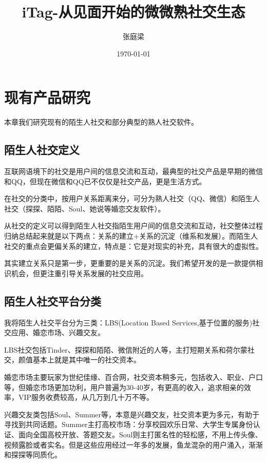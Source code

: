 \documentclass[UTF8]{ctexart}
\title{iTag-从见面开始的微微熟社交生态}
\author{张庭梁}
\date{\today}
\begin{document}
\maketitle

\section{现有产品研究}
本章我们研究现有的陌生人社交和部分典型的熟人社交软件。

\subsection{陌生人社交定义}

\begin{tcolorbox}
    互联网语境下的社交是用户间的信息交流和互动，最典型的社交产品是早期的微信和QQ，但现在微信和QQ已不仅仅是社交产品，更是生活方式。

    在社交的分类中，按用户关系距离来分，可分为熟人社交（QQ、微信）和陌生人社交（探探、陌陌、Soul、她说等婚恋交友软件）。

    从社交的定义可以得到陌生人社交指陌生用户间的信息交流和互动，社交整体过程归纳总结起来就是以下两点：关系的建立+关系的沉淀（维系和发展）。而陌生人社交的重点会更偏关系的建立，特点是：它是对现实的补充，具有很大的虚拟性。\cite{StrangerDefine}
\end{tcolorbox}

其实建立关系只是第一步，更重要的是关系的沉淀。我们希望开发的是一款提供相识机会，但更注重引导关系发展的社交应用。

\subsection{陌生人社交平台分类}
我将陌生人社交平台分为三类：LBS(Location Based Services,基于位置的服务)社交应用、婚恋市场、兴趣交友。

LBS社交包括Tinder、探探和陌陌、微信附近的人等，主打短期关系和荷尔蒙社交，颜值基本上就是其中唯一的社交资本。

婚恋市场主要玩家为世纪佳缘、百合网，社交资本稍多元，包括收入、职业、户口等，但婚恋市场更加功利，用户普遍为30-40岁，有更高的收入，追求相亲的效率，VIP服务收费较高，从几万到几十万不等。

兴趣交友类包括Soul、Summer等，本意是兴趣交友，社交资本更为多元，有助于寻找到共同话题。Summer主打高校市场：分享校园欢乐日常、大学生专属身份认证、面向全国高校开放、答题交友。Soul则主打匿名性的轻松感，不用上传头像、视频露脸或者实名。但是这些应用经过一年多的发展，鱼龙混杂的用户涌入，渐渐和探探等同质化。
\end{document}

